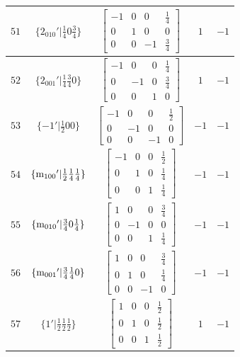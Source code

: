 \documentclass[fleqn,8pt]{jsarticle}
\begin{document}
\begin{longtable}{ccccc}
$ 51 $ & $ \{2{}_{010}{}'|\frac{1}{4} 0 \frac{3}{4}\} $ & $ \begin{bmatrix} -1 & 0 & 0 & \frac{1}{4} \\ 0 & 1 & 0 & 0 \\ 0 & 0 & -1 & \frac{3}{4} \end{bmatrix} $ & $ 1 $ & $ -1 $ \\ \hline
$ 52 $ & $ \{2{}_{001}{}'|\frac{1}{4} \frac{3}{4} 0\} $ & $ \begin{bmatrix} -1 & 0 & 0 & \frac{1}{4} \\ 0 & -1 & 0 & \frac{3}{4} \\ 0 & 0 & 1 & 0 \end{bmatrix} $ & $ 1 $ & $ -1 $ \\ \hline
$ 53 $ & $ \{-1{}'|\frac{1}{2} 0 0\} $ & $ \begin{bmatrix} -1 & 0 & 0 & \frac{1}{2} \\ 0 & -1 & 0 & 0 \\ 0 & 0 & -1 & 0 \end{bmatrix} $ & $ -1 $ & $ -1 $ \\ \hline
$ 54 $ & $ \{{\rm m}_{100}{}'|\frac{1}{2} \frac{1}{4} \frac{1}{4}\} $ & $ \begin{bmatrix} -1 & 0 & 0 & \frac{1}{2} \\ 0 & 1 & 0 & \frac{1}{4} \\ 0 & 0 & 1 & \frac{1}{4} \end{bmatrix} $ & $ -1 $ & $ -1 $ \\ \hline
$ 55 $ & $ \{{\rm m}_{010}{}'|\frac{3}{4} 0 \frac{1}{4}\} $ & $ \begin{bmatrix} 1 & 0 & 0 & \frac{3}{4} \\ 0 & -1 & 0 & 0 \\ 0 & 0 & 1 & \frac{1}{4} \end{bmatrix} $ & $ -1 $ & $ -1 $ \\ \hline
$ 56 $ & $ \{{\rm m}_{001}{}'|\frac{3}{4} \frac{1}{4} 0\} $ & $ \begin{bmatrix} 1 & 0 & 0 & \frac{3}{4} \\ 0 & 1 & 0 & \frac{1}{4} \\ 0 & 0 & -1 & 0 \end{bmatrix} $ & $ -1 $ & $ -1 $ \\ \hline
$ 57 $ & $ \{1{}'|\frac{1}{2} \frac{1}{2} \frac{1}{2}\} $ & $ \begin{bmatrix} 1 & 0 & 0 & \frac{1}{2} \\ 0 & 1 & 0 & \frac{1}{2} \\ 0 & 0 & 1 & \frac{1}{2} \end{bmatrix} $ & $ 1 $ & $ -1 $ \\ \hline

\end{longtable}
\end{document}
